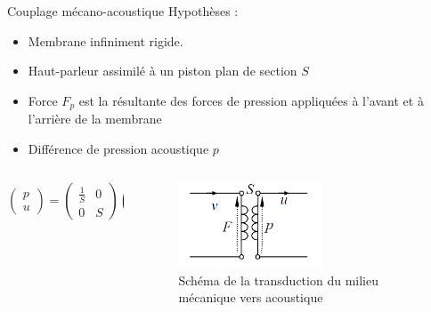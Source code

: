 \documentclass[aspectratio=169]{beamer}
\begin{document}
\begin{frame}{Couplage mécano-acoustique}
Hypothèses : 
\begin{itemize}
	\item Membrane infiniment rigide.
	\item Haut-parleur assimilé à un piston plan de section $S$
	\item Force $F_p$ est la résultante des forces de pression appliquées à l'avant et à l'arrière de la membrane
	\item Différence de pression acoustique $p$
\end{itemize}
\begin{columns}[t]\small
  \begin{column}{.5\textwidth}
  	\vfill
	\begin{displaymath}
	\left( \begin{array}{c} p \\ u \end{array} \right)
	= \left( \begin{array}{cc} \frac{1}{S} & 0\\ 0 & S \end{array} \right)
	\left( \begin{array}{c} F_p \\ v \end{array} \right)
	\end{displaymath}
  \end{column}
  \begin{column}{.5\textwidth}
	\begin{figure}[!h]
	\begin{center}
	\includegraphics[width=0.6\textwidth]{figure/schema_meca2acoustique.png}
	\end{center}
	\caption{Schéma de la transduction du milieu mécanique vers acoustique}
	\label{schema_meca2acoustique}
	\end{figure}	
  \end{column}
\end{columns}

	

\end{frame}
\end{document}
